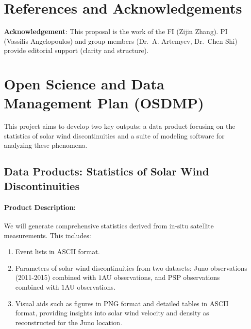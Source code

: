 \documentclass[
  letterpaper,
  DIV=11,
  numbers=noendperiod]{scrartcl}
\let\oldparagraph\paragraph
\renewcommand{\paragraph}[1]{\oldparagraph{#1}\mbox{}}
\providecommand{\tightlist}{%
  \setlength{\itemsep}{0pt}\setlength{\parskip}{0pt}}\usepackage{longtable,booktabs,array}
\begin{document}
\section{References and
Acknowledgements}\label{references-and-acknowledgements}

\renewcommand{\bibsection}{}


\textbf{Acknowledgement}: This proposal is the work of the FI (Zijin
Zhang). PI (Vassilis Angelopoulos) and group members (Dr.~A. Artemyev,
Dr.~Chen Shi) provide editorial support (clarity and structure).

\section{Open Science and Data Management Plan
(OSDMP)}\label{open-science-and-data-management-plan-osdmp}

This project aims to develop two key outputs: a data product focusing on
the statistics of solar wind discontinuities and a suite of modeling
software for analyzing these phenomena.

\subsection{Data Products: Statistics of Solar Wind
Discontinuities}\label{data-products-statistics-of-solar-wind-discontinuities}

\paragraph{Product Description:}\label{product-description}

We will generate comprehensive statistics derived from in-situ satellite
measurements. This includes:

\begin{enumerate}
\def\labelenumi{\alph{enumi}.}
\tightlist
\item
  Event lists in ASCII format.
\item
  Parameters of solar wind discontinuities from two datasets: Juno
  observations (2011-2015) combined with \(1\)AU observations, and PSP
  observations combined with \(1\)AU observations.
\item
  Visual aids such as figures in PNG format and detailed tables in ASCII
  format, providing insights into solar wind velocity and density as
  reconstructed for the Juno location.
\end{enumerate}
\end{document}
